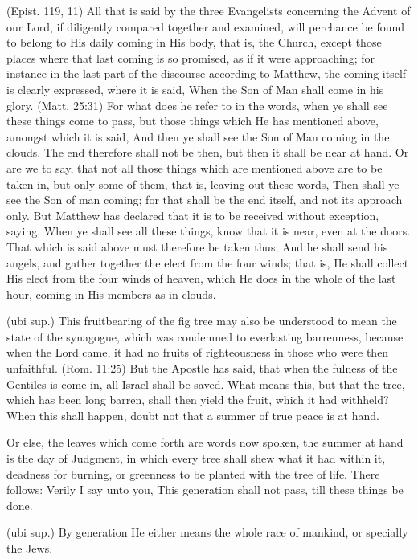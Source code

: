  (Epist. 119, 11) All that is said by the three Evangelists concerning the Advent of our Lord, if diligently compared together and examined, will perchance be found to belong to His daily coming in His body, that is, the Church, except those places where that last coming is so promised, as if it were approaching; for instance in the last part of the discourse according to Matthew, the coming itself is clearly expressed, where it is said, When the Son of Man shall come in his glory. (Matt. 25:31) For what does he refer to in the words, when ye shall see these things come to pass, but those things which He has mentioned above, amongst which it is said, And then ye shall see the Son of Man coming in the clouds. The end therefore shall not be then, but then it shall be near at hand. Or are we to say, that not all those things which are mentioned above are to be taken in, but only some of them, that is, leaving out these words, Then shall ye see the Son of man coming; for that shall be the end itself, and not its approach only. But Matthew has declared that it is to be received without exception, saying, When ye shall see all these things, know that it is near, even at the doors. That which is said above must therefore be taken thus; And he shall send his angels, and gather together the elect from the four winds; that is, He shall collect His elect from the four winds of heaven, which He does in the whole of the last hour, coming in His members as in clouds.

 (ubi sup.) This fruitbearing of the fig tree may also be understood to mean the state of the synagogue, which was condemned to everlasting barrenness, because when the Lord came, it had no fruits of righteousness in those who were then unfaithful. (Rom. 11:25) But the Apostle has said, that when the fulness of the Gentiles is come in, all Israel shall be saved. What means this, but that the tree, which has been long barren, shall then yield the fruit, which it had withheld? When this shall happen, doubt not that a summer of true peace is at hand.

 Or else, the leaves which come forth are words now spoken, the summer at hand is the day of Judgment, in which every tree shall shew what it had within it, deadness for burning, or greenness to be planted with the tree of life. There follows: Verily I say unto you, This generation shall not pass, till these things be done.

 (ubi sup.) By generation He either means the whole race of mankind, or specially the Jews.

